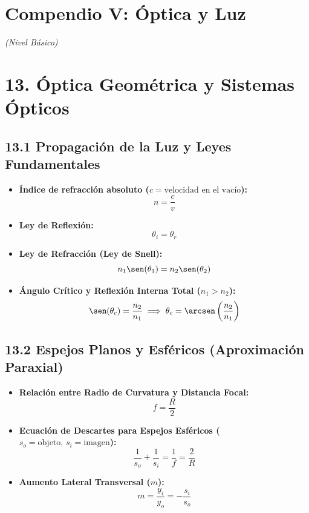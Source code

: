 \documentclass[11pt,a4paper]{article}
\begin{document}
\section*{Compendio V: Óptica y Luz}

\textit{(Nivel Básico)}

\section*{13. Óptica Geométrica y Sistemas Ópticos}

\subsection*{13.1 Propagación de la Luz y Leyes Fundamentales}

\begin{itemize}
  \item \textbf{Índice de refracción absoluto ($c = \text{velocidad en el vacío}$):}
  \[
    n = \frac{c}{v}
  \]
  \item \textbf{Ley de Reflexión:}
  \[
    \theta_i = \theta_r
  \]
  \item \textbf{Ley de Refracción (Ley de Snell):}
  \[
    n_1 \sen(\theta_1) = n_2 \sen(\theta_2)
  \]
  \item \textbf{Ángulo Crítico y Reflexión Interna Total ($n_1 > n_2$):}
  \[
    \sen(\theta_c) = \frac{n_2}{n_1} \implies \theta_c = \arcsen\left( \frac{n_2}{n_1} \right)
  \]
\end{itemize}

\subsection*{13.2 Espejos Planos y Esféricos (Aproximación Paraxial)}

\begin{itemize}
  \item \textbf{Relación entre Radio de Curvatura y Distancia Focal:}
  \[
    f = \frac{R}{2}
  \]
  \item \textbf{Ecuación de Descartes para Espejos Esféricos ($s_o = \text{objeto}, \, s_i = \text{imagen}$):}
  \[
    \frac{1}{s_o} + \frac{1}{s_i} = \frac{1}{f} = \frac{2}{R}
  \]
  \item \textbf{Aumento Lateral Transversal ($m$):}
  \[
    m = \frac{y_i}{y_o} = -\frac{s_i}{s_o}
  \]
\end{itemize}
\end{document}
